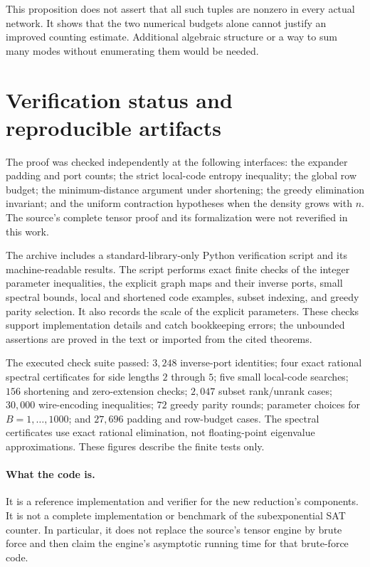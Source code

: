 \documentclass[11pt]{article}
\numberwithin{equation}{section}
\theoremstyle{definition}\newtheorem{definition}[theorem]{Definition}
\theoremstyle{remark}\newtheorem{remark}[theorem]{Remark}
\begin{document}
This proposition does not assert that all such tuples are nonzero
in every actual network. It shows that the two numerical budgets
alone cannot justify an improved counting estimate. Additional
algebraic structure or a way to sum many modes without enumerating
them would be needed.

\section{Verification status and reproducible artifacts}
\label{sec:verification}

The proof was checked independently at the following interfaces:
the expander padding and port counts; the strict local-code entropy
inequality; the global row budget; the minimum-distance argument
under shortening; the greedy elimination invariant; and the
uniform contraction hypotheses when the density grows with $n$.
The source's complete tensor proof and its formalization were not
reverified in this work.

The archive includes a standard-library-only Python verification
script and its machine-readable results. The script performs exact
finite checks of the integer parameter inequalities, the explicit
graph maps and their inverse ports, small spectral bounds, local and
shortened code examples, subset indexing, and greedy parity
selection. It also records the scale of the explicit parameters.
These checks support implementation details and catch bookkeeping
errors; the unbounded assertions are proved in the text or imported
from the cited theorems.

The executed check suite passed: $3{,}248$ inverse-port identities;
four exact rational spectral certificates for side lengths $2$ through
$5$; five small local-code searches; $156$ shortening and zero-extension
checks; $2{,}047$ subset rank/unrank cases; $30{,}000$ wire-encoding
inequalities; $72$ greedy parity rounds; parameter choices for
$B=1,\ldots,1000$; and $27{,}696$ padding and row-budget cases.
The spectral certificates use exact rational elimination, not
floating-point eigenvalue approximations. These figures describe the
finite tests only.

\paragraph{What the code is.}
It is a reference implementation and verifier for the new reduction's
components. It is not a complete implementation or benchmark of the
subexponential SAT counter. In particular, it does not replace the
source's tensor engine by brute force and then claim the engine's
asymptotic running time for that brute-force code.
\end{document}
